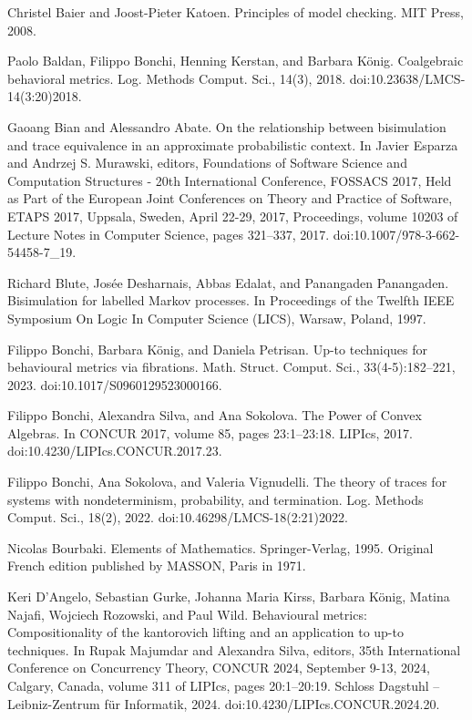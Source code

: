 \par\noindent  [8]  Christel Baier and Joost-Pieter Katoen.  Principles of model checking.  MIT Press, 2008.  
 
\par\noindent  [9]  Paolo Baldan, Filippo Bonchi, Henning Kerstan, and Barbara König.  Coalgebraic behavioral metrics.  Log. Methods Comput. Sci., 14(3), 2018.  doi:10.23638/LMCS-14(3:20)2018.  
 
\par\noindent  [10]  Gaoang Bian and Alessandro Abate.  On the relationship between bisimulation and trace equivalence in an approximate probabilistic context.  In Javier Esparza and Andrzej S. Murawski, editors, Foundations of Software Science and Computation Structures - 20th International Conference, FOSSACS 2017, Held as Part of the European Joint Conferences on Theory and Practice of Software, ETAPS 2017, Uppsala, Sweden, April 22-29, 2017, Proceedings, volume 10203 of Lecture Notes in Computer Science, pages 321–337, 2017.  doi:10.1007/978-3-662-54458-7\_19.  
 
\par\noindent  [11]  Richard Blute, Josée Desharnais, Abbas Edalat, and Panangaden Panangaden.  Bisimulation for labelled Markov processes.  In Proceedings of the Twelfth IEEE Symposium On Logic In Computer Science (LICS), Warsaw, Poland, 1997.  
 
\par\noindent  [12]  Filippo Bonchi, Barbara König, and Daniela Petrisan.  Up-to techniques for behavioural metrics via fibrations.  Math. Struct. Comput. Sci., 33(4-5):182–221, 2023.  doi:10.1017/S0960129523000166.  
 
\par\noindent  [13]  Filippo Bonchi, Alexandra Silva, and Ana Sokolova.  The Power of Convex Algebras.  In CONCUR 2017, volume 85, pages 23:1–23:18. LIPIcs, 2017.  doi:10.4230/LIPIcs.CONCUR.2017.23.  
 
\par\noindent  [14]  Filippo Bonchi, Ana Sokolova, and Valeria Vignudelli.  The theory of traces for systems with nondeterminism, probability, and termination.  Log. Methods Comput. Sci., 18(2), 2022.  doi:10.46298/LMCS-18(2:21)2022.  
 
\par\noindent  [15]  Nicolas Bourbaki.  Elements of Mathematics.  Springer-Verlag, 1995.  Original French edition published by MASSON, Paris in 1971.  
 
\par\noindent  [16]  Keri D’Angelo, Sebastian Gurke, Johanna Maria Kirss, Barbara König, Matina Najafi, Wojciech Rozowski, and Paul Wild.  Behavioural metrics: Compositionality of the kantorovich lifting and an application to up-to techniques.  In Rupak Majumdar and Alexandra Silva, editors, 35th International Conference on Concurrency Theory, CONCUR 2024, September 9-13, 2024, Calgary, Canada, volume 311 of LIPIcs, pages 20:1–20:19. Schloss Dagstuhl – Leibniz-Zentrum für Informatik, 2024.  doi:10.4230/LIPIcs.CONCUR.2024.20.  
 
